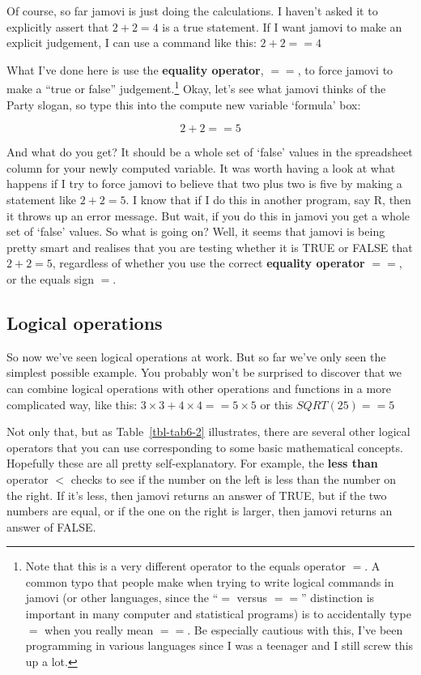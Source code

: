 \documentclass[
  a4paper,
]{book}
\begin{document}
Of course, so far jamovi is just doing the calculations. I haven't asked
it to explicitly assert that \(2 + 2 = 4\) is a true statement. If I
want jamovi to make an explicit judgement, I can use a command like
this: \(2 + 2 == 4\)

What I've done here is use the \textbf{equality operator}, \(==\), to
force jamovi to make a ``true or false'' judgement.\footnote{Note that
  this is a very different operator to the equals operator \(=\). A
  common typo that people make when trying to write logical commands in
  jamovi (or other languages, since the ``\(=\) versus \(==\)''
  distinction is important in many computer and statistical programs) is
  to accidentally type \(=\) when you really mean \(==\). Be especially
  cautious with this, I've been programming in various languages since I
  was a teenager and I still screw this up a lot.} Okay, let's see what
jamovi thinks of the Party slogan, so type this into the compute new
variable `formula' box:

\[2 + 2 == 5\]

And what do you get? It should be a whole set of `false' values in the
spreadsheet column for your newly computed variable. It was worth having
a look at what happens if I try to force jamovi to believe that two plus
two is five by making a statement like \(2 + 2 = 5\). I know that if I
do this in another program, say R, then it throws up an error message.
But wait, if you do this in jamovi you get a whole set of `false'
values. So what is going on? Well, it seems that jamovi is being pretty
smart and realises that you are testing whether it is TRUE or FALSE that
\(2 + 2 = 5\), regardless of whether you use the correct
\textbf{equality operator} \(==\), or the equals sign \(=\).

\hypertarget{logical-operations}{%
\subsection{Logical operations}\label{logical-operations}}

So now we've seen logical operations at work. But so far we've only seen
the simplest possible example. You probably won't be surprised to
discover that we can combine logical operations with other operations
and functions in a more complicated way, like this:
\(3 \times 3 + 4 \times 4 == 5 \times 5\) or this \(SQRT(25) == 5\)

Not only that, but as Table~\ref{tbl-tab6-2} illustrates, there are
several other logical operators that you can use corresponding to some
basic mathematical concepts. Hopefully these are all pretty
self-explanatory. For example, the \textbf{less than} operator \(<\)
checks to see if the number on the left is less than the number on the
right. If it's less, then jamovi returns an answer of TRUE, but if the
two numbers are equal, or if the one on the right is larger, then jamovi
returns an answer of FALSE.
\end{document}
